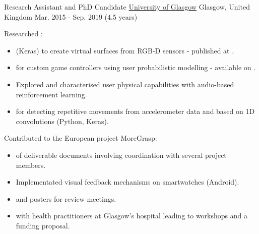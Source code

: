 \begin{cventries}
  \cventry
    {Research Assistant and PhD Candidate} %
    {\href{https://www.gla.ac.uk/schools/computing/research/researchsections/ida-section/inferencedynamicsandinteraction/}{University of Glasgow}} %
    {Glasgow, United Kingdom} %
    {Mar. 2015 - Sep. 2019 (4.5 years)} %
    {
      \begin{cvitems} %
        \item {Researched : 
        \begin{itemize}
          \item {} (Keras) to create virtual surfaces from RGB-D sensors - published at .
          \item {} for custom game controllers using user probabilistic modelling - available on .
          \item Explored and characterised user physical capabilities with audio-based reinforcement learning. 
          \item {} for detecting repetitive movements from accelerometer data and  based on 1D convolutions (Python, Keras).
          \end{itemize}
        }
        \item {Contributed to the European project MoreGrasp:
        \begin{itemize}
          \item {} of deliverable documents involving coordination with several project members.
          \item Implementated visual feedback mechanisms on smartwatches (Android).
          \item {} and posters for review meetings.
          \item {} with health practitioners at Glasgow's hospital leading to workshops and a funding proposal.

\end{itemize}}
\end{cvitems}}
\end{cventries}
